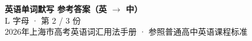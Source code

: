 \documentclass[10pt,a4paper]{article}
\begin{document}
\pagestyle{plain}

\begin{center}
{\LARGE\bfseries 英语单词默写 \quad 参考答案（英 $\to$ 中）}\\[0.22em]
{\large L 字母 · 第 2 / 3 份}\\[0.18em]
{\small 2026年上海市高考英语词汇用法手册 · 参照普通高中英语课程标准}
\end{center}

\vspace{0.2em}
\noindent{\color{rulegray}\rule{\textwidth}{0.8pt}}

\vspace{0.35em}

\vspace{0.25em}
\renewcommand{\arraystretch}{1.32}
\end{document}
